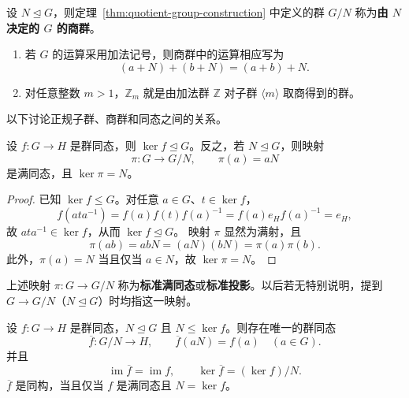 \begin{definition}[商群]\label{def:quotient-group}
设 $N\trianglelefteq G$，则定理~\ref{thm:quotient-group-construction} 中定义的群 $G/N$ 称为\textbf{由 $N$ 决定的 $G$ 的商群}。
\end{definition}

\begin{purplenote}
\begin{enumerate}[label=(\arabic*)]
  \item 若 $G$ 的运算采用加法记号，则商群中的运算相应写为
  \[
    (a+N)+(b+N)=(a+b)+N.
  \]
  \item 对任意整数 $m>1$，$\mathbb Z_m$ 就是由加法群 $\mathbb Z$ 对子群 $\langle m\rangle$ 取商得到的群。
\end{enumerate}
以下讨论正规子群、商群和同态之间的关系。
\end{purplenote}

\begin{theorem}\label{thm:kernel-and-projection}
设 $f:G\to H$ 是群同态，则 $\ker f\trianglelefteq G$。反之，若 $N\trianglelefteq G$，则映射
\[
  \pi:G\longrightarrow G/N,\qquad \pi(a)=aN
\]
是满同态，且 $\ker\pi=N$。
\end{theorem}

\begin{proof}
已知 $\ker f\leq G$。对任意 $a\in G$、$t\in\ker f$，
\[
  f(ata^{-1})=f(a)f(t)f(a)^{-1}=f(a)e_Hf(a)^{-1}=e_H,
\]
故 $ata^{-1}\in\ker f$，从而 $\ker f\trianglelefteq G$。
映射 $\pi$ 显然为满射，且
\[
  \pi(ab)=abN=(aN)(bN)=\pi(a)\pi(b).
\]
此外，$\pi(a)=N$ 当且仅当 $a\in N$，故 $\ker\pi=N$。
\end{proof}

\begin{purplenote}
上述映射 $\pi:G\to G/N$ 称为\textbf{标准满同态}或\textbf{标准投影}。以后若无特别说明，提到 $G\to G/N$（$N\trianglelefteq G$）时均指这一映射。
\end{purplenote}

\begin{theorem}\label{thm:factor-through-quotient}
设 $f:G\to H$ 是群同态，$N\trianglelefteq G$ 且 $N\leq\ker f$。则存在唯一的群同态
\[
  \overline f:G/N\longrightarrow H,
  \qquad \overline f(aN)=f(a)\quad(a\in G).
\]
并且
\[
  \operatorname{im}\overline f=\operatorname{im}f,
  \qquad \ker\overline f=(\ker f)/N.
\]
$\overline f$ 是同构，当且仅当 $f$ 是满同态且 $N=\ker f$。
\end{theorem}

